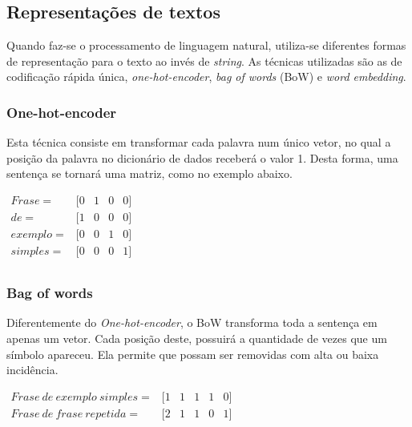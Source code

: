 \subsection{Representações de textos}

Quando faz-se o processamento de linguagem natural, utiliza-se diferentes formas de representação para o texto ao invés de \textit{string}. As técnicas utilizadas são as de codificação rápida única, \textit{one-hot-encoder}, \textit{bag of words} (BoW) e \textit{word embedding}.

\subsubsection{One-hot-encoder}

Esta técnica consiste em transformar cada palavra num único vetor, no qual a posição da palavra no dicionário de dados receberá o valor 1. Desta forma, uma sentença se tornará uma matriz, como no exemplo abaixo.

\begin{center}
    $
    \begin{array}{rcccc}
        Frase = & [ 0 & 1 & 0 & 0 ]  \\
        de  = & [ 1 & 0 & 0 & 0 ]  \\
        exemplo = & [ 0 & 0 & 1 & 0 ]  \\
        simples = & [ 0 & 0 & 0 & 1 ]  \\
    \end{array}
  	$
\end{center}

\subsubsection{Bag of words}

Diferentemente do \textit{One-hot-encoder}, o BoW transforma toda a sentença em apenas um vetor. Cada posição deste, possuirá a quantidade de vezes que um símbolo apareceu. Ela permite que possam ser removidas com alta ou baixa incidência.

\begin{center}
    $
    \begin{array}{rccccc}
        \label{ex:bow}
        Frase\ de\ exemplo\ simples = & [ 1 & 1 & 1 & 1 & 0]  \\
        Frase\ de\ frase\ repetida = & [ 2 & 1 & 1 & 0 & 1]  \\
    \end{array}
  	$
\end{center}

